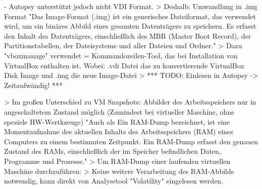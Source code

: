 			- Autopsy unterstützt jedoch nicht VDI Format.	
			> Deshalb: Umwandlung in .img Format
				"Das Image-Format (.img) ist ein generisches Dateiformat, das verwendet wird, um ein binäres Abbild eines gesamten Datenträgers zu speichern. Es erfasst den Inhalt des Datenträgers, einschließlich des MBR (Master Boot Record), der Partitionstabellen, der Dateisysteme und aller Dateien und Ordner."
			> Dazu "vboxmanage" verwendet = Kommandozeilen-Tool, das bei Installation von VirtualBox enthalten ist.	
			  	Wobei: .vdi Datei das zu konvertierende VirtualBox Disk Image und .img die neue Image-Datei
			> *** TODO: Einlesen in Autopsy -> Zeitaufwändig! ***			

	> Im großen Unterschied zu VM Snapshots: Abbilder des Arbeitsspeichers nur in angeschaltetem Zustand möglich (Zumindest bei virtueller Maschine, ohne speziele HW-Wertkzeuge)
		"Auch als Ein RAM-Dump bezeichnet, ist eine Momentaufnahme des aktuellen Inhalts des Arbeitsspeichers (RAM) eines Computers zu einem bestimmten Zeitpunkt. Ein RAM-Dump erfasst den genauen Zustand des RAMs, einschließlich der im Speicher befindlichen Daten, Programme und Prozesse."
		> Um RAM-Dump einer laufenden virtuellen Maschine durchzuführen: 
		> Keine weitere Verarbeitung des RAM-Abbilds notwendig, kann direkt von Analysetool "Volatility" eingelesen werden.		

